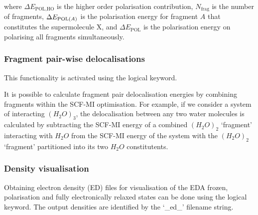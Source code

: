 \documentclass[letterpaper,10pt,english]{sphinxmanual}
\begin{document}
\begin{DUlineblock}{0em}
\item[] where \(\Delta E_\textrm{POL,HO}\) is the higher order
polarisation contribution, \(N_\textrm{frag}\) is the number of
fragments, \(\Delta E_\textrm{POL(\textit{A})}\) is the
polarisation energy for fragment \(A\) that constitutes the
supermolecule \(\textrm{X}\), and \(\Delta E_\textrm{POL}\) is
the polarisation energy on polarising all fragments simultaneously.
\end{DUlineblock}


\subsubsection{Fragment pair-wise delocalisations}
\label{\detokenize{EDA:fragment-pair-wise-delocalisations}}
\begin{DUlineblock}{0em}
\item[] 
\item[] This functionality is activated using the  logical
keyword.
\end{DUlineblock}

It is possible to calculate fragment pair delocalisation energies by
combining fragments within the SCF-MI optimisation. For example, if we
consider a system of interacting \((H_2O)_3\), the delocalisation
between any two water molecules is calculated by subtracting the SCF-MI
energy of a combined \((H_2O)_2\) ‘fragment’ interacting with
\(H_2O\) from the SCF-MI energy of the system with the
\((H_2O)_2\) ‘fragment’ partitioned into its two \(H_2O\)
constitutents.


\subsubsection{Density visualisation}
\label{\detokenize{EDA:density-visualisation}}
Obtaining electron density (ED) files for visualisation of the EDA
frozen, polarisation and fully electronically relaxed states can be done
using the  logical keyword. The output densities
are identified by the ‘\_ed\_’ filename string.
\end{document}
